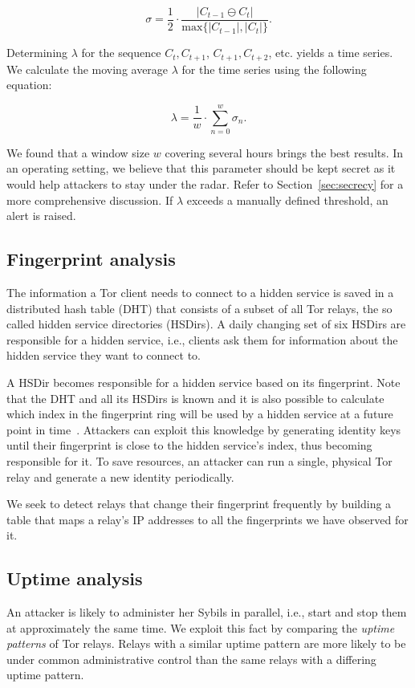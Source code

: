$$
\sigma = \frac{1}{2} \cdot \frac{\lvert C_{t-1} \ominus C_{t} \rvert}
{\textrm{max}\{\lvert C_{t-1} \rvert, \lvert C_{t} \rvert \}}.
$$

Determining $\lambda$ for the sequence $C_{t}, C_{t+1}$, $C_{t+1}, C_{t+2}$,
etc. yields a time series.  We calculate the moving average $\lambda$ for the
time series using the following equation:

$$
\lambda = \frac{1}{w} \cdot \sum_{n=0}^{w} \sigma_{n}.
$$

We found that a window size $w$ covering several hours brings the best results.
In an operating setting, we believe that this parameter should be kept secret
as it would help attackers to stay under the radar.  Refer to
Section~\ref{sec:secrecy} for a more comprehensive discussion.  If $\lambda$
exceeds a manually defined threshold, an alert is raised.

\subsection{Fingerprint analysis}
The information a Tor client needs to connect to a hidden service is saved in a
distributed hash table (DHT) that consists of a subset of all Tor relays, the
so called hidden service directories (HSDirs).  A daily changing set of six
HSDirs are responsible for a hidden service, i.e., clients ask them for
information about the hidden service they want to connect to.

A HSDir becomes responsible for a hidden service based on its fingerprint.
Note that the DHT and all its HSDirs is known and it is also possible to
calculate which index in the fingerprint ring will be used by a hidden service
at a future point in time~\cite{Biryukov2013a}.  Attackers can exploit this
knowledge by generating identity keys until their fingerprint is close to the
hidden service's index, thus becoming responsible for it.  To save resources,
an attacker can run a single, physical Tor relay and generate a new identity
periodically.

We seek to detect relays that change their fingerprint frequently by building a
table that maps a relay's IP addresses to all the fingerprints we have observed
for it.

\subsection{Uptime analysis}
An attacker is likely to administer her Sybils in parallel, i.e., start and
stop them at approximately the same time.  We exploit this fact by comparing
the \emph{uptime patterns} of Tor relays.  Relays with a similar uptime pattern
are more likely to be under common administrative control than the same relays
with a differing uptime pattern.

